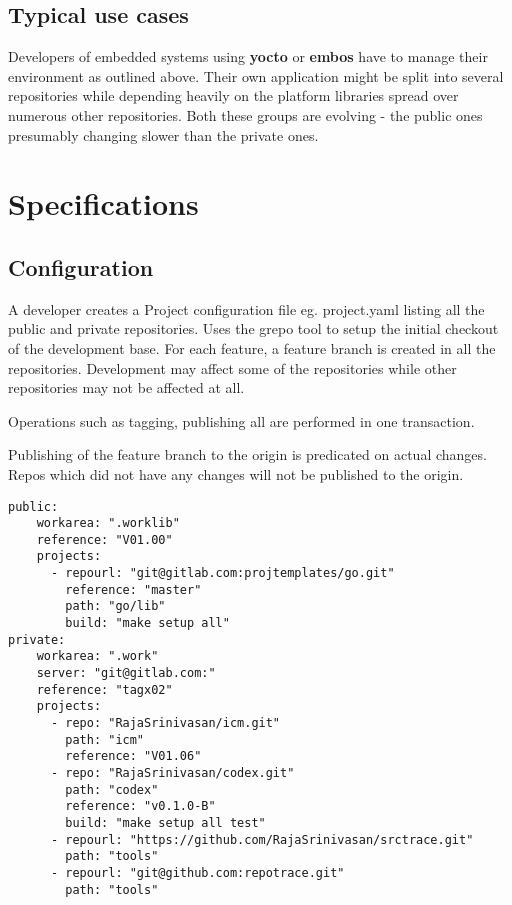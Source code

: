 \documentclass[11pt, a4paper]{article} %
\begin{document}
\subsection{Typical use cases}

Developers of embedded systems using \textbf{yocto} or \textbf{embos} have to manage their environment as outlined above. Their own application might be split into several repositories while depending heavily on the platform libraries spread over numerous other repositories. Both these groups are evolving - the public ones presumably changing slower than the private ones.

\section{Specifications}

\subsection{Configuration}

A developer creates a Project configuration file eg. project.yaml listing all the public and private repositories. Uses the grepo tool to setup the initial checkout of the development base. For each feature, a feature branch is created in all the repositories. Development may affect some of the repositories while other repositories may not be affected at all.

Operations such as tagging, publishing all are performed in one transaction. 

Publishing of the feature branch to the origin is predicated on actual changes. Repos which did not have any changes will not be published to the origin.

\begin{lstlisting}[caption=Example Project.yaml]
public:
    workarea: ".worklib"
    reference: "V01.00"
    projects:
      - repourl: "git@gitlab.com:projtemplates/go.git"
        reference: "master"
        path: "go/lib"
        build: "make setup all"
private:
    workarea: ".work"
    server: "git@gitlab.com:"
    reference: "tagx02"
    projects:
      - repo: "RajaSrinivasan/icm.git"
        path: "icm"
        reference: "V01.06"
      - repo: "RajaSrinivasan/codex.git"
        path: "codex"
        reference: "v0.1.0-B"
        build: "make setup all test"
      - repourl: "https://github.com/RajaSrinivasan/srctrace.git"
        path: "tools"
      - repourl: "git@github.com:repotrace.git"
        path: "tools"
\end{lstlisting}
\end{document}
